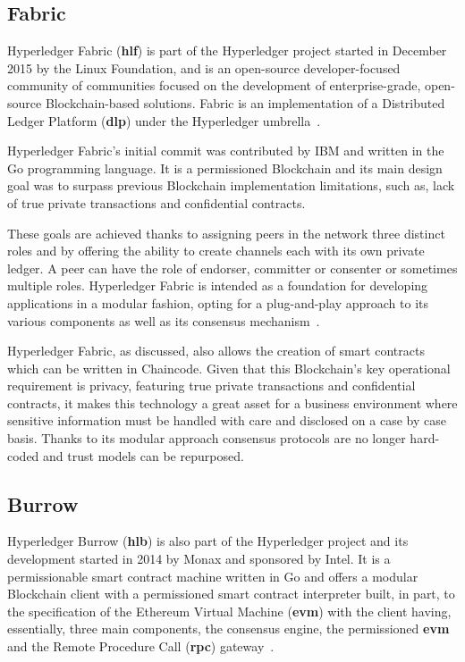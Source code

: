 \subsection{Fabric}

Hyperledger Fabric (\textbf{hlf}) is part of the Hyperledger project started in
December 2015 by the Linux Foundation, and is an open-source developer-focused
community of communities focused on the development of enterprise-grade,
open-source Blockchain-based solutions.  Fabric is an implementation of a
Distributed Ledger Platform (\textbf{dlp}) under the Hyperledger
umbrella~\cite{Cachin2016}.

Hyperledger Fabric’s initial commit was contributed by IBM and written in the
Go programming language.  It is a permissioned Blockchain and its main design
goal was to surpass previous Blockchain implementation limitations, such as,
lack of true private transactions and confidential contracts.

These goals are achieved thanks to assigning peers in the network three
distinct roles and by offering the ability to create channels each with its own
private ledger.  A peer can have the role of endorser, committer or consenter
or sometimes multiple roles.  Hyperledger Fabric is intended as a foundation
for developing applications in a modular fashion, opting for a plug-and-play
approach to its various components as well as its consensus
mechanism~\cite{HyperledgerFabricDocs2017}.

Hyperledger Fabric, as discussed, also allows the creation of smart contracts
which can be written in Chaincode.  Given that this Blockchain's key
operational requirement is privacy, featuring true private transactions and
confidential contracts, it makes this technology a great asset for a business
environment where sensitive information must be handled with care and disclosed
on a case by case basis.  Thanks to its modular approach consensus protocols
are no longer hard-coded and trust models can be repurposed.

\subsection{Burrow}

Hyperledger Burrow (\textbf{hlb}) is also part of the Hyperledger project and
its development started in 2014 by Monax and sponsored by Intel. It is a
permissionable smart contract machine written in Go and offers a modular
Blockchain client with a permissioned smart contract interpreter built, in
part, to the specification of the Ethereum Virtual Machine (\textbf{evm}) with
the client having, essentially, three main components, the consensus engine,
the permissioned \textbf{evm} and the Remote Procedure Call (\textbf{rpc})
gateway~\cite{Kuhlman2017,HyperledgerBurrow2017}.


